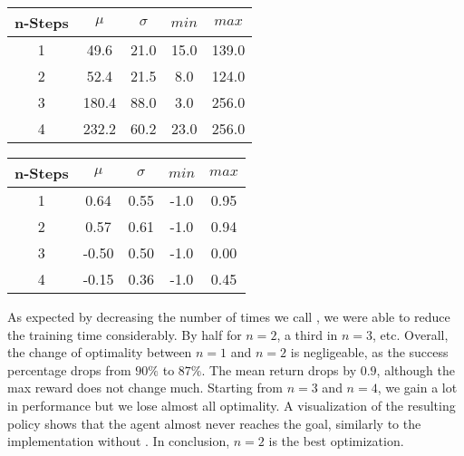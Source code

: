 \begin{table}[h!]
        \centering
        \begin{minipage}{.5\textwidth}
    \begin{tabular}[width=1\linewidth]{||c c c c c||} 
     \hline
     n-Steps & $\mu$ & $\sigma$ & $min$ & $max$ \\  [0.5ex] 
     \hline\hline
     1 & 49.6 & 21.0 & 15.0 & 139.0 \\ 
     \hline
     2 & 52.4 & 21.5 & 8.0 & 124.0 \\
     \hline
     3 & 180.4 & 88.0 & 3.0 & 256.0 \\
     \hline
     4 & 232.2 & 60.2 & 23.0 & 256.0 \\ [1ex] 
     \hline
    \end{tabular}
\end{minipage}%
\begin{minipage}{.5\textwidth}
    \centering
    \begin{tabular}[width=1\linewidth]{||c c c c c||} 
     \hline
     n-Steps & $\mu$ & $\sigma$ & $min$ & $max$ \\  [0.5ex] 
     \hline\hline
     1 & 0.64 & 0.55 & -1.0 & 0.95 \\ 
     \hline
     2 & 0.57 & 0.61 & -1.0 & 0.94 \\
     \hline
     3 & -0.50 & 0.50 & -1.0 & 0.00 \\
     \hline
     4 & -0.15 & 0.36 & -1.0 & 0.45 \\ [1ex] 
     \hline
    \end{tabular}
\end{minipage}%
\end{table}

As expected by decreasing the number of times we call \dio, we were able to reduce the 
training time considerably. By half for $n=2$, a third in $n=3$, etc. Overall, the change of optimality 
between $n=1$ and $n=2$ is negligeable, as the success percentage drops from $90\%$ to $87\%$. 
The mean return drops by $0.9$, although the max reward does not change much. 
Starting from $n=3$ and $n=4$, we gain a lot in performance but we lose almost all optimality. 
A visualization of the resulting policy shows that the agent almost never reaches the goal, similarly to the 
implementation without \dio. In conclusion, $n=2$ is the best optimization. 


